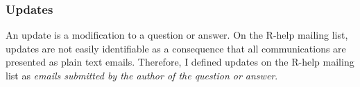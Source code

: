 \documentclass{sig-alternate-05-2015}
\begin{document}





\subsubsection*{Updates}

	An update is a modification to a question or answer.
	On the R-help mailing list, updates are not easily identifiable as a consequence that all communications are presented as plain text emails.
	Therefore, I defined updates on the R-help mailing list as \emph{emails submitted by the author of the question or answer}.
\end{document}
